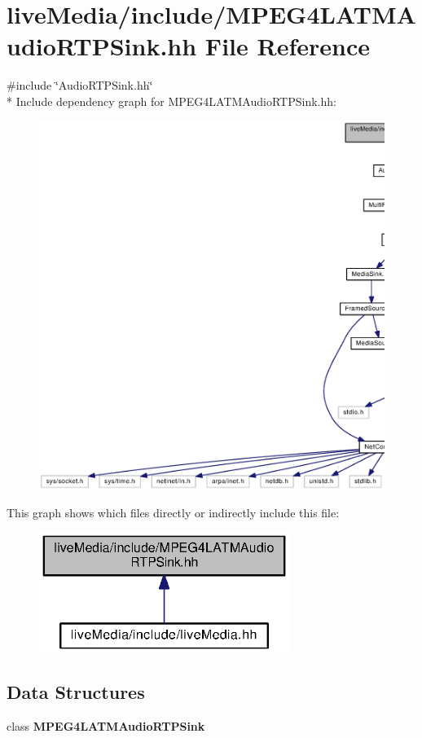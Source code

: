 \section{live\+Media/include/\+M\+P\+E\+G4\+L\+A\+T\+M\+Audio\+R\+T\+P\+Sink.hh File Reference}
\label{MPEG4LATMAudioRTPSink_8hh}
{\ttfamily \#include \char`\"{}Audio\+R\+T\+P\+Sink.\+hh\char`\"{}}\\*
Include dependency graph for M\+P\+E\+G4\+L\+A\+T\+M\+Audio\+R\+T\+P\+Sink.\+hh\+:
\nopagebreak
\begin{figure}[H]
\begin{center}
\leavevmode
\includegraphics[width=350pt]{MPEG4LATMAudioRTPSink_8hh__incl}
\end{center}
\end{figure}
This graph shows which files directly or indirectly include this file\+:
\nopagebreak
\begin{figure}[H]
\begin{center}
\leavevmode
\includegraphics[width=230pt]{MPEG4LATMAudioRTPSink_8hh__dep__incl}
\end{center}
\end{figure}
\subsection*{Data Structures}
\begin{DoxyCompactItemize}
\item 
class {\bf M\+P\+E\+G4\+L\+A\+T\+M\+Audio\+R\+T\+P\+Sink}
\end{DoxyCompactItemize}
